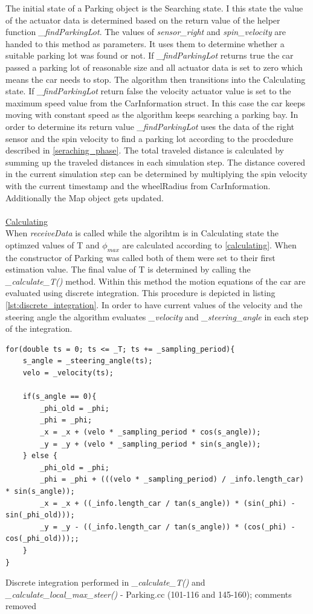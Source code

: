 \documentclass[paper=a4, fontsize=11pt]{scrreprt}
\begin{document}
The initial state of a Parking object is the Searching state. I this state the value of the actuator data is determined based on the return value of the helper function \textit{\_findParkingLot}. The values of \textit{sensor\_right} and \textit{spin\_velocity} are handed to this method as parameters. It uses them to determine whether a suitable parking lot was found or not. If \textit{\_findParkingLot} returns true the car passed a parking lot of reasonable size and all actuator data is set to zero which means the car needs to stop. The algorithm then transitions into the Calculating state. If \textit{\_findParkingLot} return false the velocity actuator value is set to the maximum speed value from the CarInformation struct. In this case the car keeps moving with constant speed as the algorithm keeps searching a parking bay. In order to determine its return value \textit{\_findParkingLot} uses the data of the right sensor and the spin velocity to find a parking lot according to the procdedure described in \ref{seraching_phase}. The total traveled distance is calculated by summing up the traveled distances in each simulation step. The distance covered in the current simulation step can be determined by multiplying the spin velocity with the current timestamp and the wheelRadius from CarInformation. Additionally the Map object gets updated.\\
\\
\underline{Calculating}\\
When \textit{receiveData} is called while the algorihtm is in Calculating state the optimzed values of T and $\phi_{max}$ are calculated according to \ref{calculating}. When the constructor of Parking was called both of them were set to their first estimation value. The final value of T is determined by calling the \textit{\_calculate\_T()} method. Within this method the motion equations of the car are evaluated using discrete integration. This procedure is depicted in listing \ref{lst:discrete_integration}. In order to have current values of the velocity and the steering angle the algorithm evaluates \textit{\_velocity} and \textit{\_steering\_angle} in each step of the integration.
\begin{listing}[H]
\begin{verbatim}
for(double ts = 0; ts <= _T; ts += _sampling_period){
	s_angle = _steering_angle(ts);
    velo = _velocity(ts);

    if(s_angle == 0){
		_phi_old = _phi;
		_phi = _phi;
		_x = _x + (velo * _sampling_period * cos(s_angle));
		_y = _y + (velo * _sampling_period * sin(s_angle));
	} else {
		_phi_old = _phi;
		_phi = _phi + (((velo * _sampling_period) / _info.length_car) * sin(s_angle));
		_x = _x + ((_info.length_car / tan(s_angle)) * (sin(_phi) - sin(_phi_old)));
		_y = _y - ((_info.length_car / tan(s_angle)) * (cos(_phi) - cos(_phi_old)));;
	}
}
\end{verbatim}
\caption{\tiny Discrete integration performed in \textit{\_calculate\_T()} and \textit{\_calculate\_local\_max\_steer()} - Parking.cc (101-116 and 145-160); comments removed}
\label{lst:discrete_integration}
\end{listing}
\end{document}

